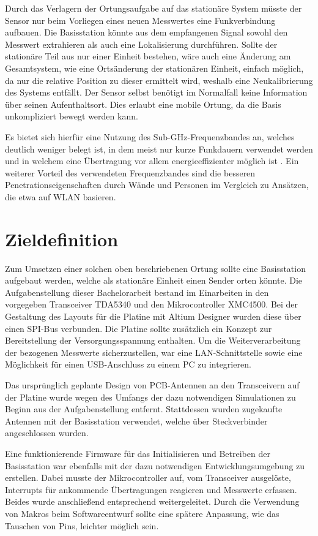 Durch das Verlagern der Ortungsaufgabe auf das stationäre System müsste der Sensor nur beim Vorliegen eines neuen Messwertes eine Funkverbindung aufbauen. Die Basisstation könnte aus dem empfangenen Signal sowohl den Messwert extrahieren als auch eine Lokalisierung durchführen.
Sollte der stationäre Teil  aus nur einer Einheit bestehen, wäre auch eine Änderung am Gesamtsystem, wie eine Ortsänderung der stationären Einheit, einfach möglich, da nur die relative Position zu dieser ermittelt wird, weshalb eine Neukalibrierung des Systems entfällt. Der Sensor selbst benötigt im Normalfall keine Information über seinen Aufenthaltsort. Dies erlaubt eine mobile Ortung, da die Basis unkompliziert bewegt werden kann.


Es bietet sich hierfür eine Nutzung des Sub-GHz-Frequenzbandes an, welches deutlich weniger belegt ist, in dem meist nur kurze Funkdauern verwendet werden und in welchem eine Übertragung vor allem energieeffizienter möglich ist \cite{SabolcikGHzoderSub}.
Ein weiterer Vorteil des verwendeten Frequenzbandes sind die besseren Penetrationseigenschaften durch Wände und Personen im Vergleich zu Ansätzen, die etwa auf WLAN basieren.


\section{Zieldefinition}
Zum Umsetzen einer solchen oben beschriebenen Ortung sollte eine Basisstation aufgebaut werden, welche als stationäre Einheit einen Sender orten könnte.
Die Aufgabenstellung dieser Bachelorarbeit bestand im Einarbeiten in den vorgegeben Transceiver TDA5340 und den Mikrocontroller XMC4500. Bei der Gestaltung des Layouts für die Platine mit Altium Designer wurden diese über einen SPI-Bus verbunden. Die Platine sollte zusätzlich ein Konzept zur Bereitstellung der Versorgungsspannung enthalten. Um die Weiterverarbeitung der bezogenen Messwerte sicherzustellen, war eine LAN-Schnittstelle sowie eine Möglichkeit für einen USB-Anschluss zu einem PC zu integrieren.

Das ursprünglich geplante Design von PCB-Antennen an den Transceivern auf der Platine wurde wegen des Umfangs der dazu  notwendigen Simulationen  zu Beginn aus der Aufgabenstellung entfernt. Stattdessen wurden zugekaufte Antennen mit der Basisstation verwendet, welche über Steckverbinder angeschlossen wurden.

Eine funktionierende Firmware für das Initialisieren und Betreiben der Basisstation war ebenfalls mit der dazu notwendigen Entwicklungsumgebung zu erstellen. Dabei musste der Mikrocontroller auf, vom Transceiver ausgelöste, Interrupts für ankommende Übertragungen reagieren und Messwerte erfassen. Beides wurde anschließend entsprechend weitergeleitet. Durch die Verwendung von Makros beim Softwareentwurf sollte eine spätere Anpassung, wie das Tauschen von Pins, leichter möglich sein.


